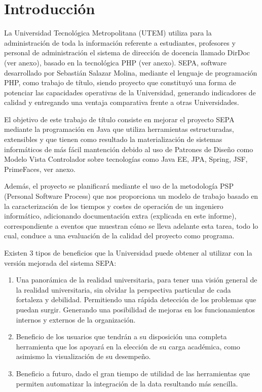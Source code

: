 \documentclass[a4paper,12pt,openany,oneside]{book}
\begin{document}
\chapter*{Introducción}
La Universidad Tecnológica Metropolitana (UTEM) utiliza para la administración de toda la información referente a estudiantes, profesores y personal de administración el sistema de dirección de docencia llamado DirDoc (ver anexo), basado en la tecnológica PHP (ver anexo). SEPA, software desarrollado por Sebastián Salazar Molina, mediante el lenguaje de programación PHP, como trabajo de título, siendo proyecto que constituyó una forma de potenciar las capacidades operativas de la Universidad, generando indicadores de calidad y entregando una ventaja comparativa frente a otras Universidades.

El objetivo de este trabajo de título consiste en mejorar el proyecto SEPA mediante la programación en Java que utiliza herramientas estructuradas, extensibles y que tienen como resultado la materialización de sistemas informáticos de más fácil mantención debido al uso de Patrones de Diseño como Modelo Vista Controlador sobre tecnologías como Java EE, JPA, Spring, JSF, PrimeFaces, ver anexo.

Además, el proyecto se planificará mediante el uso de la metodología PSP (Personal Software Process) que nos proporciona un modelo de trabajo basado en la caracterización de los tiempos y costes de operación de un ingeniero informático, adicionando documentación extra (explicada en este informe), correspondiente a eventos que muestran cómo se lleva adelante esta tarea, todo lo cual, conduce a una evaluación de la calidad del proyecto como programa.

Existen 3 tipos de beneficios que la Universidad puede obtener al utilizar con la versión mejorada del sistema SEPA:

\begin{enumerate}
\item Una panorámica de la realidad universitaria, para tener una visión general de la realidad universitaria, sin olvidar la perspectiva particular de cada fortaleza y debilidad. Permitiendo una rápida detección de los problemas que puedan surgir. Generando una posibilidad de mejoras en los funcionamientos internos y externos de la organización.

\item Beneficio de los usuarios que tendrán a su disposición una completa herramienta que los apoyará en la elección de su carga académica, como asimismo la visualización de su desempeño.

\item Beneficio a futuro, dado el gran tiempo de utilidad de las herramientas que permiten automatizar la integración de la data resultando más sencilla.
\end{enumerate}
\end{document}
